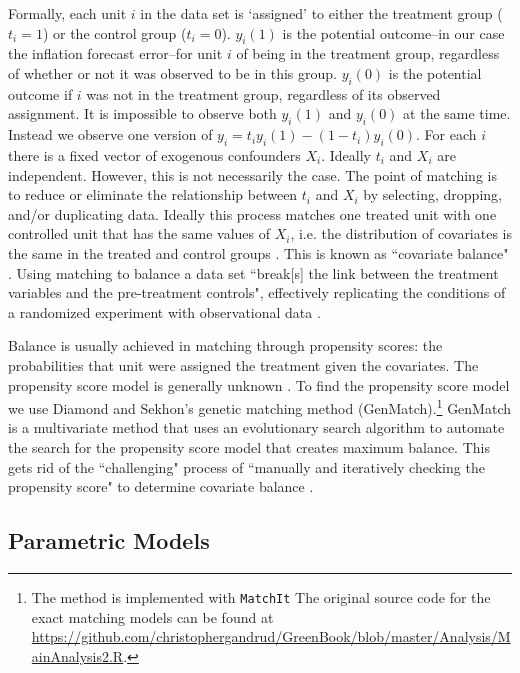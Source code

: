 \documentclass[a4paper]{article}\usepackage{graphicx, color}
\begin{document}
Formally, each unit $i$ in the data set is `assigned' to either the treatment group ($t_{i} = 1$) or the control group ($t_{i} = 0$). $y_{i}(1)$ is the potential outcome--in our case the inflation forecast error--for unit $i$ of being in the treatment group, regardless of whether or not it was observed to be in this group. $y_{i}(0)$ is the potential outcome if $i$ was not in the treatment group, regardless of its observed assignment. It is impossible to observe both $y_{i}(1)$ and $y_{i}(0)$ at the same time. Instead we observe one version of $y_{i}=t_{i}y_{i}(1)-(1-t_{i})y_i(0)$. For each $i$ there is a fixed vector of exogenous confounders $X_{i}$. Ideally $t_{i}$ and $X_{i}$ are independent. However, this is not necessarily the case. The point of matching is to reduce or eliminate the relationship between $t_{i}$  and $X_{i}$ by selecting, dropping, and/or duplicating data. Ideally this process matches one treated unit with one controlled unit that has the same values of $X_{i}$, i.e. the distribution of covariates is the same in the treated and control groups \citep{matchit2011}. This is known as ``covariate balance" \cite[1]{Diamond2012}. Using matching to balance a data set ``break[s] the link between the treatment variables and the pre-treatment controls", effectively replicating the conditions of a randomized experiment with observational data \cite[][2--3]{matchit2011}. 

Balance is usually achieved in matching through propensity scores: the probabilities that unit were assigned the treatment given the covariates. The propensity score model is generally unknown \citep{Drake1993}. To find the propensity score model we use Diamond and Sekhon's \citeyearpar{Diamond2012} genetic matching method (GenMatch).\footnote{The method is implemented with {\tt{MatchIt}} The original source code for the exact matching models can be found at {\url{https://github.com/christophergandrud/GreenBook/blob/master/Analysis/MainAnalysis2.R}}.} GenMatch is a multivariate method that uses an evolutionary search algorithm to automate the search for the propensity score model that creates maximum balance. This gets rid of the ``challenging" process of ``manually and iteratively checking the propensity score" to determine covariate balance \citep[][2]{Diamond2012}. 


\subsection{Parametric Models}
\end{document}
